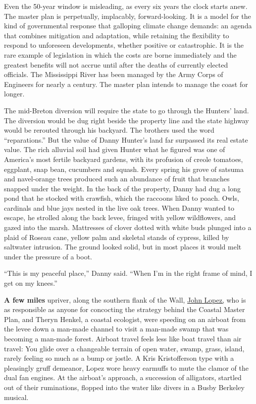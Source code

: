 Even the 50-year window is misleading, as every six years the clock
starts anew. The master plan is perpetually, implacably,
forward-looking. It is a model for the kind of governmental response
that galloping climate change demands: an agenda that combines
mitigation and adaptation, while retaining the flexibility to respond to
unforeseen developments, whether positive or catastrophic. It is the
rare example of legislation in which the costs are borne immediately and
the greatest benefits will not accrue until after the deaths of
currently elected officials. The Mississippi River has been managed by
the Army Corps of Engineers for nearly a century. The master plan
intends to manage the coast for longer.

The mid-Breton diversion will require the state to go through the
Hunters' land. The diversion would be dug right beside the property line
and the state highway would be rerouted through his backyard. The
brothers used the word ``reparations.'' But the value of Danny Hunter's
land far surpassed its real estate value. The rich alluvial soil had
given Hunter what he figured was one of America's most fertile backyard
gardens, with its profusion of creole tomatoes, eggplant, snap bean,
cucumbers and squash. Every spring his grove of satsuma and navel-orange
trees produced such an abundance of fruit that branches snapped under
the weight. In the back of the property, Danny had dug a long pond that
he stocked with crawfish, which the raccoons liked to poach. Owls,
cardinals and blue jays nested in the live oak trees. When Danny wanted
to escape, he strolled along the back levee, fringed with yellow
wildflowers, and gazed into the marsh. Mattresses of clover dotted with
white buds plunged into a plaid of Roseau cane, yellow palm and skeletal
stands of cypress, killed by saltwater intrusion. The ground looked
solid, but in most places it would melt under the pressure of a boot.

``This is my peaceful place,'' Danny said. ``When I'm in the right frame
of mind, I get on my knees.''

\textbf{A few miles} upriver, along the southern flank of the Wall,
\href{http://mississippiriverdelta.org/staff/john-lopez/}{John Lopez,}
who is as responsible as anyone for concocting the strategy behind the
Coastal Master Plan, and Theryn Henkel, a coastal ecologist, were
speeding on an airboat from the levee down a man-made channel to visit a
man-made swamp that was becoming a man-made forest. Airboat travel feels
less like boat travel than air travel: You glide over a changeable
terrain of open water, swamp, grass, island, rarely feeling so much as a
bump or jostle. A Kris Kristofferson type with a pleasingly gruff
demeanor, Lopez wore heavy earmuffs to mute the clamor of the dual fan
engines. At the airboat's approach, a succession of alligators, startled
out of their ruminations, flopped into the water like divers in a Busby
Berkeley musical.

